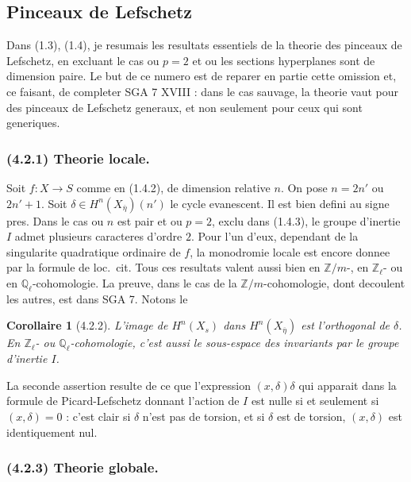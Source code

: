 \documentclass[12pt,a4paper]{article}
\theoremstyle{plain}
\newtheorem{corollary}[theorem]{Corollaire}
\theoremstyle{definition}
\theoremstyle{remark}
\newcommand{\bbZ}{\mathbb{Z}}
\newcommand{\Zl}{\mathbb{Z}_\ell}
\newcommand{\Ql}{\mathbb{Q}_\ell}
\begin{document}
\subsection{Pinceaux de Lefschetz}

Dans (1.3), (1.4), je resumais les resultats essentiels de la theorie des pinceaux de Lefschetz, en excluant le cas ou $p=2$ et ou les sections hyperplanes sont de dimension paire. Le but de ce numero est de reparer en partie cette omission et, ce faisant, de completer SGA 7 XVIII : dans le cas sauvage, la theorie vaut pour des pinceaux de Lefschetz generaux, et non seulement pour ceux qui sont generiques.

\subsubsection*{\textup{(4.2.1)} Theorie locale.}

Soit $f : X \to S$ comme en (1.4.2), de dimension relative $n$. On pose $n = 2n'$ ou $2n'+1$. Soit $\delta \in H^n(X_{\overline{\eta}})(n')$ le cycle evanescent. Il est bien defini au signe pres. Dans le cas ou $n$ est pair et ou $p=2$, exclu dans (1.4.3), le groupe d'inertie $I$ admet plusieurs caracteres d'ordre $2$. Pour l'un d'eux, dependant de la singularite quadratique ordinaire de $f$, la monodromie locale est encore donnee par la formule de loc.~cit. Tous ces resultats valent aussi bien en $\bbZ/m$-, en $\Zl$- ou en $\Ql$-cohomologie. La preuve, dans le cas de la $\bbZ/m$-cohomologie, dont decoulent les autres, est dans SGA 7. Notons le

\begin{corollary}[4.2.2]
L'image de $H^n(X_s)$ dans $H^n(X_{\overline{\eta}})$ est l'orthogonal de $\delta$. En $\Zl$- ou $\Ql$-cohomologie, c'est aussi le sous-espace des invariants par le groupe d'inertie $I$.
\end{corollary}

La seconde assertion resulte de ce que l'expression $(x, \delta)\delta$ qui apparait dans la formule de Picard-Lefschetz donnant l'action de $I$ est nulle si et seulement si $(x, \delta) = 0$ : c'est clair si $\delta$ n'est pas de torsion, et si $\delta$ est de torsion, $(x, \delta)$ est identiquement nul.

\subsubsection*{\textup{(4.2.3)} Theorie globale.}
\end{document}
